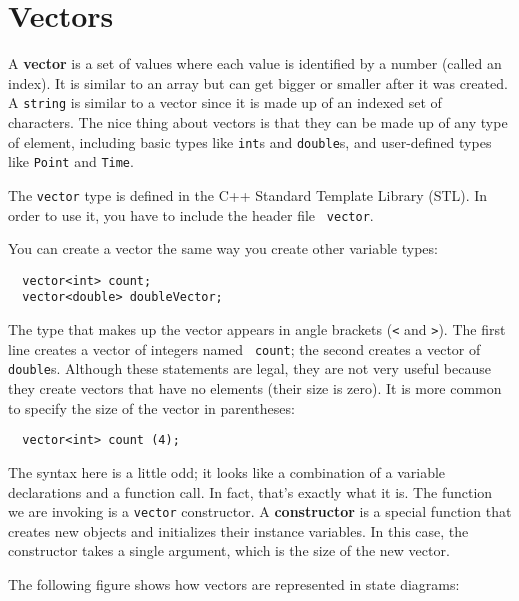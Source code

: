 

\chapter{Vectors}
\label{vectors}

A {\bf vector} is a set of values where each value is identified by a
number (called an index). It is similar to an array but can get bigger or smaller after it was created.  A {\tt string} is similar to a vector
since it is made up of an indexed set of characters.  The nice thing
about vectors is that they can be made up of any type of element,
including basic types like {\tt int}s and {\tt double}s, 
and user-defined types like {\tt Point} and {\tt Time}.

The {\tt vector} type is defined in the C++ Standard Template Library (STL).
In order to use it, you have to include the header file {\tt
vector}.

You can create a vector the same way you create other variable types:

\begin{verbatim}
  vector<int> count;
  vector<double> doubleVector;
\end{verbatim}
%
The type that makes up the vector appears in angle brackets ({\tt <}
and {\tt >}).  The first line creates a vector of integers named {\tt
count}; the second creates a vector of {\tt double}s.  Although these
statements are legal, they are not very useful because they create
vectors that have no elements (their size is zero).  It is more
common to specify the size of the vector in parentheses:

\begin{verbatim}
  vector<int> count (4);
\end{verbatim}
%
The syntax here is a little odd; it looks like a combination of a
variable declarations and a function call.  In fact, that's exactly
what it is.  The function we are invoking is a {\tt vector}
constructor.  A {\bf constructor} is a special function that creates
new objects and initializes their instance variables.  In this case,
the constructor takes a single argument, which is the size of the new
vector.


The following figure shows how vectors are represented in state
diagrams:

\vspace{0.1in}
\centerline{}
\vspace{0.1in}


